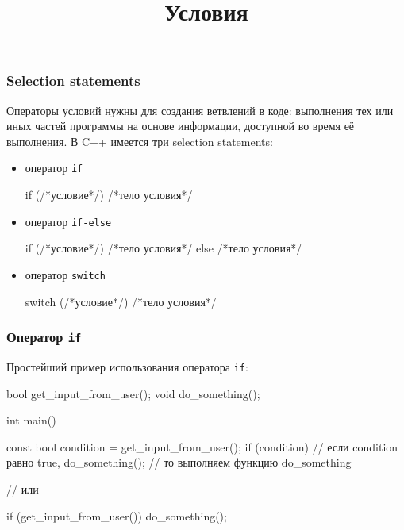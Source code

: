 \documentclass[compress, 8pt]{beamer}
\title{Условия}
\begin{document}
\frame[plain]{\titlepage}

\begin{frame}[fragile]

    \frametitle{Selection statements}

    Операторы условий нужны для создания ветвлений в коде: выполнения тех или
    иных частей программы на основе информации, доступной во время её выполнения.
    В C++ имеется три selection statements:

    \hfill \break

    \begin{itemize}
        \item оператор \verb|if|\footnotemark{}
        \begin{myinplacelisting}[minted language=cpp]
if (/*условие*/) {/*тело условия*/}
        \end{myinplacelisting}

        \item оператор \verb|if-else|
        \begin{myinplacelisting}[minted language=cpp]
if (/*условие*/) {/*тело условия*/} else {/*тело условия*/}
        \end{myinplacelisting}

        \item оператор \verb|switch|
        \begin{myinplacelisting}[minted language=cpp]
switch (/*условие*/) {/*тело условия*/}
        \end{myinplacelisting}
    \end{itemize}


\end{frame}

\begin{frame}[fragile]

    \frametitle{Оператор \texttt{if}}

    Простейший пример использования оператора \verb|if|:

    \begin{myinplacelisting}[minted language=cpp]
bool get_input_from_user();
void do_something();

int main() {

    const bool condition = get_input_from_user();
    if (condition) {    // если condition равно true,
        do_something(); // то выполняем функцию do_something
    }

    // или

    if (get_input_from_user()) {
        do_something();
    }

}
    \end{myinplacelisting}

\end{frame}
\end{document}

